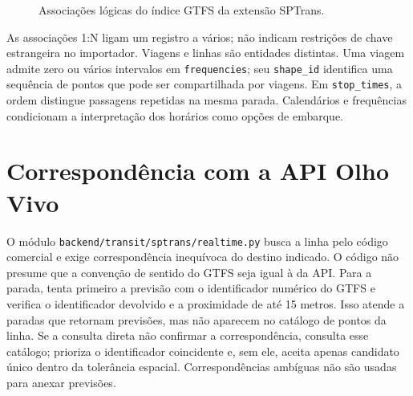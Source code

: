 \documentclass[12pt,oneside,a4paper,brazil,chapter=TITLE]{abntex2}
\let\papsection\section
\renewcommand{\section}{\clearpage\papsection}
\begin{document}
\begin{apendicesenv}
\begin{figure}[H]\centering
{}
\caption{Associações lógicas do índice GTFS da extensão SPTrans.}\label{fig:banco-mbm}
\end{figure}
As associações 1:N ligam um registro a vários; não indicam restrições de chave estrangeira no importador. Viagens e linhas são entidades distintas. Uma viagem admite zero ou vários intervalos em \texttt{frequencies}; seu \texttt{shape\_id} identifica uma sequência de pontos que pode ser compartilhada por viagens. Em \texttt{stop\_times}, a ordem distingue passagens repetidas na mesma parada. Calendários e frequências condicionam a interpretação dos horários como opções de embarque.

\section{Correspondência com a API Olho Vivo}
O módulo \nolinkurl{backend/transit/sptrans/realtime.py} busca a linha pelo código comercial e exige correspondência inequívoca do destino indicado. O código não presume que a convenção de sentido do GTFS seja igual à da API. Para a parada, tenta primeiro a previsão com o identificador numérico do GTFS e verifica o identificador devolvido e a proximidade de até 15 metros. Isso atende a paradas que retornam previsões, mas não aparecem no catálogo de pontos da linha. Se a consulta direta não confirmar a correspondência, consulta esse catálogo; prioriza o identificador coincidente e, sem ele, aceita apenas candidato único dentro da tolerância espacial. Correspondências ambíguas não são usadas para anexar previsões.


\end{apendicesenv}
\end{document}

